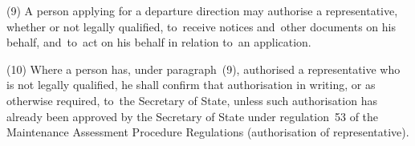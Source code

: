 \documentclass[12pt,a4paper]{article}
\begin{document}
(9) A person applying for a departure direction may authorise a representative,
whether or not legally qualified, to~receive notices and~other documents on his
behalf, and~to~act on his behalf in relation to~an application.

(10) Where a person has, under paragraph~(9), authorised a representative who is
not legally qualified, he shall confirm that authorisation in writing, or as
otherwise required, to~the Secretary of State, unless such authorisation has
already been approved by the Secretary of State under regulation~53 of the
Maintenance Assessment Procedure Regulations (authorisation of representative).

%
%
%
%
%

\end{document}
